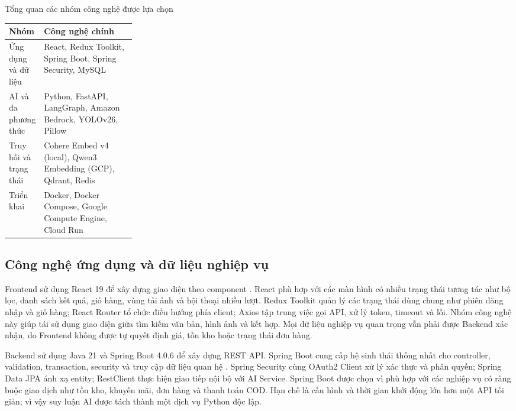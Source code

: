 \begin{breakabletable}
    \centering
    \caption{Tổng quan các nhóm công nghệ được lựa chọn}
    \label{tab:technology_stack_overview}
    \renewcommand{\arraystretch}{1.15}
    \begin{tabularx}{\linewidth}{|p{0.25\linewidth}|X|}
        \hline
        \textbf{Nhóm} & \textbf{Công nghệ chính} \\ \hline
        Ứng dụng và dữ liệu & React, Redux Toolkit, Spring Boot, Spring Security, MySQL \\ \hline
        AI và đa phương thức & Python, FastAPI, LangGraph, Amazon Bedrock, YOLOv26, Pillow \\ \hline
        Truy hồi và trạng thái & Cohere Embed v4 (local), Qwen3 Embedding (GCP), Qdrant, Redis \\ \hline
        Triển khai & Docker, Docker Compose, Google Compute Engine, Cloud Run \\ \hline
    \end{tabularx}
\end{breakabletable}

\subsection{Công nghệ ứng dụng và dữ liệu nghiệp vụ}

Frontend sử dụng React 19 để xây dựng giao diện theo component \parencite{reactdocs2024}.
React phù hợp với các màn hình có nhiều trạng thái tương tác như bộ lọc, danh sách
kết quả, giỏ hàng, vùng tải ảnh và hội thoại nhiều lượt. Redux Toolkit quản lý các
trạng thái dùng chung như phiên đăng nhập và giỏ hàng; React Router tổ chức điều
hướng phía client; Axios tập trung việc gọi API, xử lý token, timeout và lỗi. Nhóm
công nghệ này giúp tái sử dụng giao diện giữa tìm kiếm văn bản, hình ảnh và kết hợp.
Mọi dữ liệu nghiệp vụ quan trọng vẫn phải được Backend xác nhận, do Frontend không
được tự quyết định giá, tồn kho hoặc trạng thái đơn hàng.

Backend sử dụng Java 21 và Spring Boot 4.0.6 để xây dựng REST API. Spring Boot cung
cấp hệ sinh thái thống nhất cho controller, validation, transaction, security và
truy cập dữ liệu quan hệ \parencite{springbootdocs2024}. Spring Security cùng OAuth2
Client xử lý xác thực và phân quyền; Spring Data JPA ánh xạ entity; RestClient thực
hiện giao tiếp nội bộ với AI Service. Spring Boot được chọn vì phù hợp với các nghiệp
vụ có ràng buộc giao dịch như tồn kho, khuyến mãi, đơn hàng và thanh toán COD. Hạn
chế là cấu hình và thời gian khởi động lớn hơn một API tối giản; vì vậy suy luận AI
được tách thành một dịch vụ Python độc lập.

